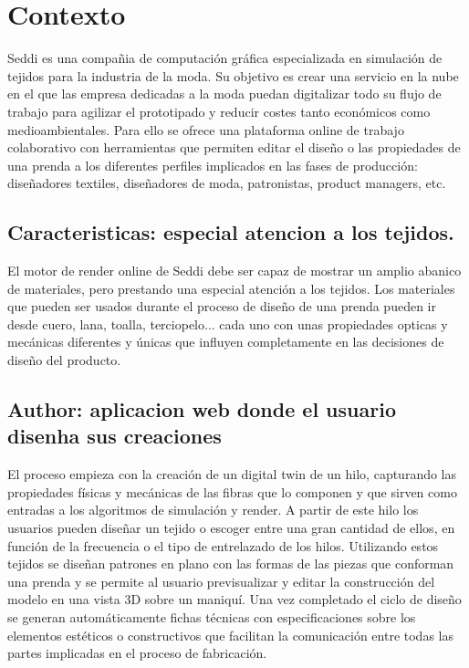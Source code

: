 \chapter{Contexto}
    Seddi es una compañia de computación gráfica especializada en simulación de tejidos para la
    industria de la moda.
    Su objetivo es crear una servicio en la nube en el que las empresa dedicadas a la moda puedan
    digitalizar todo su flujo de trabajo para agilizar el prototipado y reducir costes tanto económicos
    como medioambientales. Para ello se ofrece una plataforma online de trabajo colaborativo con
    herramientas que permiten editar el diseño o las propiedades de una prenda a los diferentes
    perfiles implicados en las fases de producción: diseñadores textiles, diseñadores de moda,
    patronistas, product managers, etc.

\section{Caracteristicas: especial atencion a los tejidos.}
    El motor de render online de Seddi debe ser capaz de mostrar un amplio abanico de materiales,
    pero prestando una especial atenci\'on a los tejidos. Los materiales que pueden ser usados durante
    el proceso de dise\~no de una prenda pueden ir desde cuero, lana, toalla, terciopelo... cada uno
    con unas propiedades opticas y mec\'anicas diferentes y \'unicas que influyen completamente en las
    decisiones de dise\~no del producto.

\section{Author: aplicacion web donde el usuario disenha sus creaciones}
    El proceso empieza con la creación de un digital twin de un hilo, capturando las propiedades
    físicas y mecánicas de las fibras que lo componen y que sirven como entradas a los algoritmos de
    simulación y render. A partir de este hilo los usuarios pueden diseñar un tejido o escoger entre
    una gran cantidad de ellos, en función de la frecuencia o el tipo de entrelazado de los hilos.
    Utilizando estos tejidos se diseñan patrones en plano con las formas de las piezas que conforman
    una prenda y se permite al usuario previsualizar y editar la construcción del modelo en una vista
    3D sobre un maniquí. Una vez completado el ciclo de diseño se generan automáticamente fichas técnicas
    con especificaciones sobre los elementos estéticos o constructivos que facilitan la comunicación
    entre todas las partes implicadas en el proceso de fabricación.